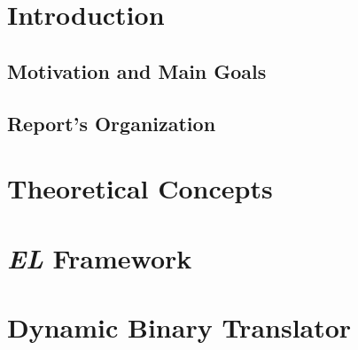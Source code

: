 \documentclass[12pt]{article}
\begin{document}
\renewcommand{\listtablename}{Tables}
\listoftables


\lstlistoflistings

\printglossaries


\newpage
\section{Introduction}
\subsection{Motivation and Main Goals}

\subsection{Report's Organization}

\newpage
\section{Theoretical Concepts}




\newpage
\section{\textit{EL} Framework}

\newpage
\section{Dynamic Binary Translator}

\newpage
\end{document}
